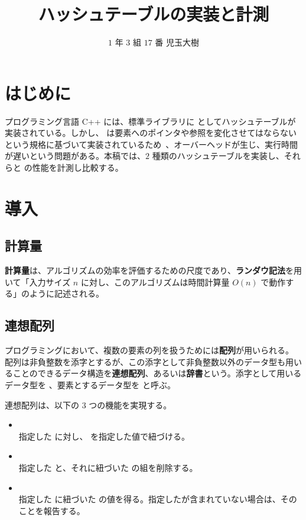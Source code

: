 \documentclass[dvipdfmx,a4j,10pt]{jarticle}
\begin{document}
\title{ハッシュテーブルの実装と計測}
\author{$1$ 年 $3$ 組 $17$ 番 児玉大樹}
\date{}
\maketitle

\section{はじめに}

プログラミング言語 C++ には、標準ライブラリに  としてハッシュテーブルが実装されている。しかし、 は要素へのポインタや参照を変化させてはならないという規格に基づいて実装されているため~\cite{C++Draft}、オーバーヘッドが生じ、実行時間が遅いという問題がある。本稿では、$2$ 種類のハッシュテーブルを実装し、それらと  の性能を計測し比較する。

\section{導入}

\subsection{計算量}

\textbf{計算量}は、アルゴリズムの効率を評価するための尺度であり、\textbf{ランダウ記法}を用いて「入力サイズ $n$ に対し、このアルゴリズムは時間計算量 $O(n)$ で動作する」のように記述される。

\subsection{連想配列}

プログラミングにおいて、複数の要素の列を扱うためには\textbf{配列}が用いられる。
配列は非負整数を添字とするが、この添字として非負整数以外のデータ型も用いることのできるデータ構造を\textbf{連想配列}、あるいは\textbf{辞書}という。添字として用いるデータ型を 、要素とするデータ型を  と呼ぶ。

連想配列は、以下の $3$ つの機能を実現する。

\begin{itemize}
  \item {} \mbox{}\\ 指定した  に対し、 を指定した値で紐づける。
  \item {} \mbox{}\\ 指定した  と、それに紐づいた  の組を削除する。
  \item {} \mbox{}\\ 指定した  に紐づいた  の値を得る。指定したが含まれていない場合は、そのことを報告する。
\end{itemize}
\end{document}
